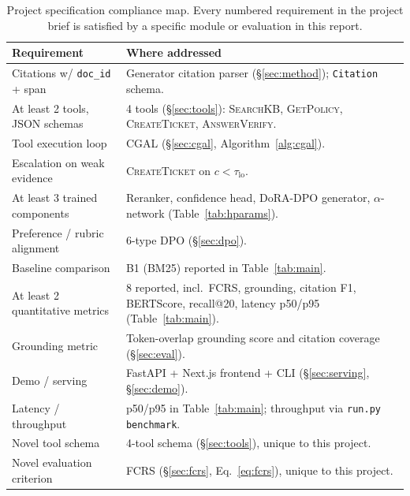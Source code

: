 \documentclass[11pt,a4paper,twocolumn]{article}
\begin{document}
\begin{table}[t]
\centering\small
\setlength{\tabcolsep}{4pt}
\begin{tabular}{L{3.2cm}L{4.4cm}}
\toprule
\textbf{Requirement} & \textbf{Where addressed} \\
\midrule
Citations w/ \texttt{doc\_id} + span & Generator citation parser
(\S\ref{sec:method}); \texttt{Citation} schema. \\
At least 2 tools, JSON schemas & 4 tools (\S\ref{sec:tools}):
\textsc{SearchKB}, \textsc{GetPolicy}, \textsc{CreateTicket},
\textsc{AnswerVerify}. \\
Tool execution loop & CGAL (\S\ref{sec:cgal},
Algorithm~\ref{alg:cgal}). \\
Escalation on weak evidence & \textsc{CreateTicket} on $c<\tau_{\text{lo}}$. \\
At least 3 trained components & Reranker, confidence head, DoRA-DPO
generator, $\alpha$-network (Table~\ref{tab:hparams}). \\
Preference / rubric alignment & 6-type DPO (\S\ref{sec:dpo}). \\
Baseline comparison & B1 (BM25) reported in Table~\ref{tab:main}. \\
At least 2 quantitative metrics & 8 reported, incl.\ FCRS, grounding,
citation F1, BERTScore, recall@20, latency p50/p95
(Table~\ref{tab:main}). \\
Grounding metric & Token-overlap grounding score and citation coverage
(\S\ref{sec:eval}). \\
Demo / serving & FastAPI + Next.js frontend + CLI
(\S\ref{sec:serving}, \S\ref{sec:demo}). \\
Latency / throughput & p50/p95 in Table~\ref{tab:main}; throughput
via \texttt{run.py benchmark}. \\
Novel tool schema & 4-tool schema (\S\ref{sec:tools}), unique to this
project. \\
Novel evaluation criterion & FCRS (\S\ref{sec:fcrs},
Eq.~\ref{eq:fcrs}), unique to this project. \\
\bottomrule
\end{tabular}
\caption{Project specification compliance map. Every numbered
requirement in the project brief is satisfied by a specific module or
evaluation in this report.}\label{tab:compliance}
\end{table}
\end{document}
